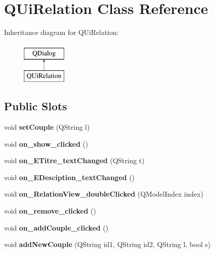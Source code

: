 \hypertarget{class_q_ui_relation}{}\section{Q\+Ui\+Relation Class Reference}
\label{class_q_ui_relation}
Inheritance diagram for Q\+Ui\+Relation\+:\begin{figure}[H]
\begin{center}
\leavevmode
\includegraphics[height=2.000000cm]{class_q_ui_relation}
\end{center}
\end{figure}
\subsection*{Public Slots}
\begin{DoxyCompactItemize}
\item 
\mbox{\label{class_q_ui_relation_af3d9485700aafc469bd69adb2023d8d4}} 
void {\bfseries set\+Couple} (Q\+String l)
\item 
\mbox{\label{class_q_ui_relation_a66b413fb02bae1c7ce504395655cd47f}} 
void {\bfseries on\+\_\+show\+\_\+clicked} ()
\item 
\mbox{\label{class_q_ui_relation_aa21c9863da04b78e380733a49542c98b}} 
void {\bfseries on\+\_\+\+E\+Titre\+\_\+text\+Changed} (Q\+String t)
\item 
\mbox{\label{class_q_ui_relation_a092e6a03e3ca7b4f6bb061d6b618edb0}} 
void {\bfseries on\+\_\+\+E\+Desciption\+\_\+text\+Changed} ()
\item 
\mbox{\label{class_q_ui_relation_a28751a4ca2c2efb17c12bb45811a4b27}} 
void {\bfseries on\+\_\+\+Relation\+View\+\_\+double\+Clicked} (Q\+Model\+Index index)
\item 
\mbox{\label{class_q_ui_relation_a14fddadaa70fa8c82a0e49a547e2f6b5}} 
void {\bfseries on\+\_\+remove\+\_\+clicked} ()
\item 
\mbox{\label{class_q_ui_relation_a728ef8313c868dd268473db03c358412}} 
void {\bfseries on\+\_\+add\+Couple\+\_\+clicked} ()
\item 
\mbox{\label{class_q_ui_relation_a85b1d8b5dd11254d36eb1a7a1fb0f12d}} 
void {\bfseries add\+New\+Couple} (Q\+String id1, Q\+String id2, Q\+String l, bool s)
\end{DoxyCompactItemize}
